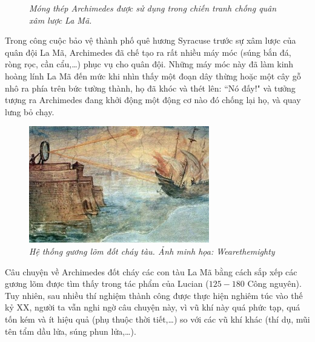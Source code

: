 \begin{multicols}{2}
\begin{figure}[H]
		\caption{\small\textit{\color{lichsutoanhoc}Móng thép Archimedes được sử dụng trong chiến tranh chống quân xâm lược La Mã.}}
		\vspace*{-10pt}
	\end{figure}
	Trong công cuộc bảo vệ thành phố quê hương Syracuse trước sự xâm lược của quân đội La Mã, Archimedes đã chế tạo ra rất nhiều máy móc (súng bắn đá, ròng rọc, cần cẩu,\ldots) phục vụ cho quân đội. Những máy móc này đã làm kinh hoàng lính La Mã đến mức khi nhìn thấy một đoạn dây thừng hoặc một cây gỗ nhô ra phía trên bức tường thành, họ đã khóc và thét lên: ``Nó đấy!" và tưởng tượng ra Archimedes đang khởi động một động cơ nào đó chống lại họ, và quay lưng bỏ chạy.
	\begin{figure}[H]
		\vspace*{-5pt}
		\centering
		\captionsetup{labelformat= empty, justification=centering}
		\includegraphics[width= 1\linewidth]{4}
		\caption{\small\textit{\color{lichsutoanhoc}Hệ thống gương lõm đốt cháy tàu. 
				Ảnh minh họa: Wearethemighty}}
		\vspace*{-5pt}
	\end{figure}
	Câu chuyện về Archimedes đốt cháy các con tàu La Mã bằng cách sắp xếp các gương lõm được tìm thấy trong tác phẩm của Lucian ($125-180$ Công nguyên). Tuy nhiên, sau nhiều thí nghiệm thành công được thực hiện nghiêm túc vào thế kỷ XX, người ta vẫn nghi ngờ câu chuyện này, vì vũ khí này quá phức tạp, quá tốn kém và ít hiệu quả (phụ thuộc thời tiết,\ldots) so với các vũ khí khác (thí dụ, mũi tên tẩm dầu lửa, súng phun lửa,\ldots). 
	\begin{figure}[H]
		\vspace*{-5pt}
		\centering
		\captionsetup{labelformat= empty, justification=centering}

\end{figure}
\end{multicols}
